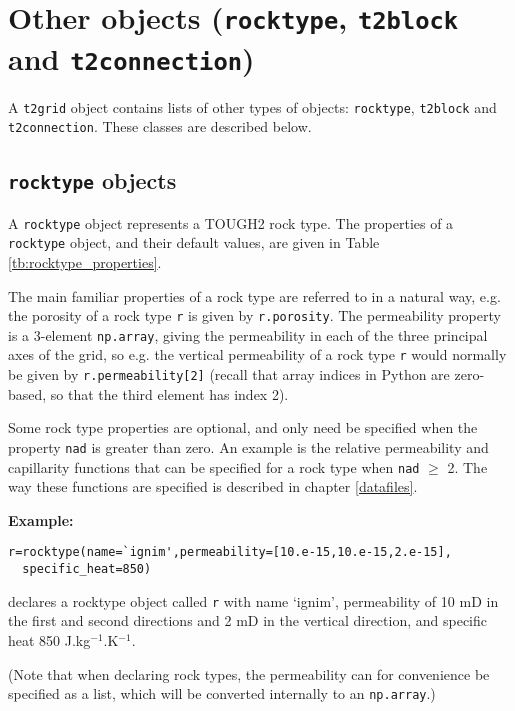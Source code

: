 \section{Other objects (\texttt{rocktype}, \texttt{t2block} and \texttt{t2connection})}

A \texttt{t2grid} object contains lists of other types of objects: \texttt{rocktype}, \texttt{t2block} and \texttt{t2connection}.  These classes are described below.

\subsection{\texttt{rocktype} objects}

A \texttt{rocktype} object represents a TOUGH2 rock type.  The properties of a \texttt{rocktype} object, and their default values, are given in Table \ref{tb:rocktype_properties}.

The main familiar properties of a rock type are referred to in a natural way, e.g. the porosity of a rock type \texttt{r} is given by \texttt{r.porosity}.  The permeability property is a 3-element \texttt{np.array}, giving the permeability in each of the three principal axes of the grid, so e.g. the vertical permeability of a rock type \texttt{r} would normally be given by \texttt{r.permeability[2]} (recall that array indices in Python are zero-based, so that the third element has index 2).

Some rock type properties are optional, and only need be specified when the property \texttt{nad} is greater than zero.  An example is the relative permeability and capillarity functions that can be specified for a rock type when \texttt{nad} $\ge$ 2.  The way these functions are specified is described in chapter \ref{datafiles}.

\textbf{Example:}

\begin{verbatim}
r=rocktype(name=`ignim',permeability=[10.e-15,10.e-15,2.e-15],
  specific_heat=850)
\end{verbatim}

declares a rocktype object called \texttt{r} with name `ignim', permeability of 10 mD in the first and second directions and 2 mD in the vertical direction, and specific heat 850 J.kg$^{-1}$.K$^{-1}$.

(Note that when declaring rock types, the permeability can for convenience be specified as a list, which will be converted internally to an \texttt{np.array}.)

